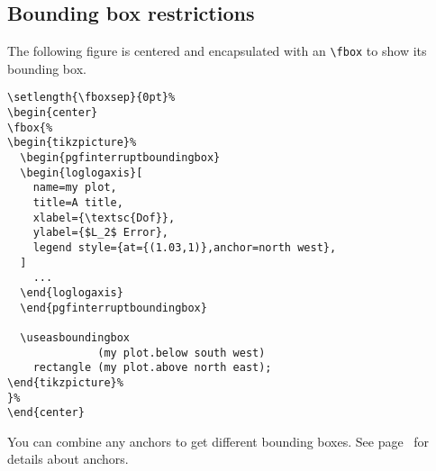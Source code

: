 \subsection{Bounding box restrictions}
\label{sec:bounding:box:example}%
{%
The following figure is centered and encapsulated with an \lstinline!\fbox! to show its bounding box.
\setlength{\fboxsep}{0pt}%
\begin{center}
%
\end{center}
}%
\begin{lstlisting}
\setlength{\fboxsep}{0pt}%
\begin{center}
\fbox{%
\begin{tikzpicture}%
  \begin{pgfinterruptboundingbox}
  \begin{loglogaxis}[
	name=my plot,
	title=A title,
	xlabel={\textsc{Dof}},
	ylabel={$L_2$ Error},
	legend style={at={(1.03,1)},anchor=north west},
  ]
	...
  \end{loglogaxis}
  \end{pgfinterruptboundingbox}

  \useasboundingbox 
  			  (my plot.below south west) 
	rectangle (my plot.above north east);
\end{tikzpicture}%
}%
\end{center}
\end{lstlisting}
You can combine any anchors to get different bounding boxes. See page~\pageref{option:anchor} for details about anchors.

